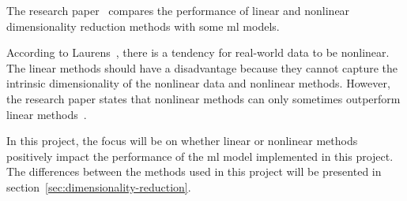 The research paper~\cite{dimensionality-reduction-comparative-review} compares the performance of linear and nonlinear dimensionality reduction methods with some \gls{ml} models. 

According to Laurens~\cite{dimensionality-reduction-comparative-review}, there is a tendency for real-world data to be nonlinear. The linear methods should have a disadvantage because they cannot capture the intrinsic dimensionality of the nonlinear data and nonlinear methods. However, the research paper states that nonlinear methods can only sometimes outperform linear methods~\cite{dimensionality-reduction-comparative-review}.  

In this project, the focus will be on whether linear or nonlinear methods positively impact the performance of the \gls{ml} model implemented in this project. The differences between the methods used in this project will be presented in section~\ref{sec:dimensionality-reduction}.

 



